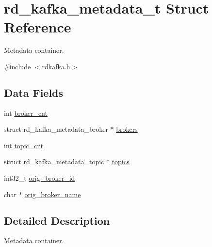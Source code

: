\hypertarget{structrd__kafka__metadata__t}{
\section{rd\_\-kafka\_\-metadata\_\-t Struct Reference}
\label{structrd__kafka__metadata__t}
}


Metadata container.  


{\ttfamily \#include $<$rdkafka.h$>$}\subsection*{Data Fields}
\begin{DoxyCompactItemize}
\item 
int \hyperlink{structrd__kafka__metadata__t_a856ef1431ec96dc5e17aa201eabb471d}{broker\_\-cnt}
\item 
struct rd\_\-kafka\_\-metadata\_\-broker $\ast$ \hyperlink{structrd__kafka__metadata__t_ad42c894b30cf7bd1d2a737b3ebc41e72}{brokers}
\item 
int \hyperlink{structrd__kafka__metadata__t_acaafc5b2980d35330c213dfa7b3ae063}{topic\_\-cnt}
\item 
struct rd\_\-kafka\_\-metadata\_\-topic $\ast$ \hyperlink{structrd__kafka__metadata__t_aaf7472220f7c197fb7cd4a73a40ba1b8}{topics}
\item 
int32\_\-t \hyperlink{structrd__kafka__metadata__t_a5ad3f68559288a9d95698bb830d7b5ed}{orig\_\-broker\_\-id}
\item 
char $\ast$ \hyperlink{structrd__kafka__metadata__t_a6d94b09d2634a23e3ffa3c0bb5b9f5e4}{orig\_\-broker\_\-name}
\end{DoxyCompactItemize}


\subsection{Detailed Description}
Metadata container. 

